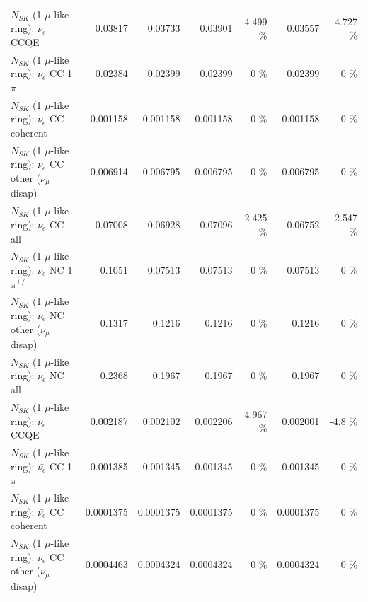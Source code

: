 \begin{table}
\begin{tabular}{| l | r | r | r  r | r  r |}
\hline
\hline
\hline
                                      $N_{SK}$ (1 $\mu$-like ring): $\nu_e$ CCQE &         0.03817 &         0.03733 &         0.03901 &    4.499 \%  &         0.03557 &   -4.727 \%  \\ 
                                 $N_{SK}$ (1 $\mu$-like ring): $\nu_e$ CC 1$\pi$ &         0.02384 &         0.02399 &         0.02399 &        0 \%  &         0.02399 &        0 \%  \\ 
                               $N_{SK}$ (1 $\mu$-like ring): $\nu_e$ CC coherent &        0.001158 &        0.001158 &        0.001158 &        0 \%  &        0.001158 &        0 \%  \\ 
                $N_{SK}$ (1 $\mu$-like ring): $\nu_e$ CC other ($\nu_\mu$ disap) &        0.006914 &        0.006795 &        0.006795 &        0 \%  &        0.006795 &        0 \%  \\ 
                                  $N_{SK}$ (1 $\mu$-like ring): $\nu_{e}$ CC all &         0.07008 &         0.06928 &         0.07096 &    2.425 \%  &         0.06752 &   -2.547 \%  \\ 
\hline
                           $N_{SK}$ (1 $\mu$-like ring): $\nu_e$ NC 1$\pi^{+/-}$ &          0.1051 &         0.07513 &         0.07513 &        0 \%  &         0.07513 &        0 \%  \\ 
                $N_{SK}$ (1 $\mu$-like ring): $\nu_e$ NC other ($\nu_\mu$ disap) &          0.1317 &          0.1216 &          0.1216 &        0 \%  &          0.1216 &        0 \%  \\ 
                                  $N_{SK}$ (1 $\mu$-like ring): $\nu_{e}$ NC all &          0.2368 &          0.1967 &          0.1967 &        0 \%  &          0.1967 &        0 \%  \\ 
\hline
\hline
\hline
                                $N_{SK}$ (1 $\mu$-like ring): $\bar{\nu_e}$ CCQE &        0.002187 &        0.002102 &        0.002206 &    4.967 \%  &        0.002001 &     -4.8 \%  \\ 
                           $N_{SK}$ (1 $\mu$-like ring): $\bar{\nu_e}$ CC 1$\pi$ &        0.001385 &        0.001345 &        0.001345 &        0 \%  &        0.001345 &        0 \%  \\ 
                         $N_{SK}$ (1 $\mu$-like ring): $\bar{\nu_e}$ CC coherent &       0.0001375 &       0.0001375 &       0.0001375 &        0 \%  &       0.0001375 &        0 \%  \\ 
          $N_{SK}$ (1 $\mu$-like ring): $\bar{\nu_e}$ CC other ($\nu_\mu$ disap) &       0.0004463 &       0.0004324 &       0.0004324 &        0 \%  &       0.0004324 &        0 \%  \\ 

\end{tabular}
\end{table}
